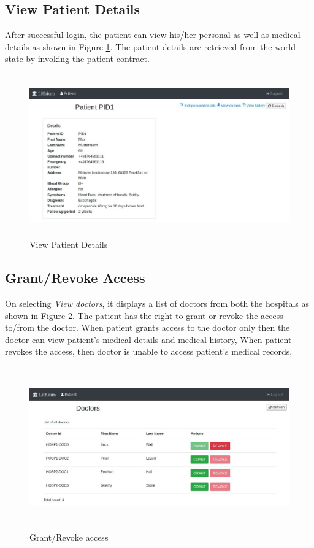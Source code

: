 \subsection{View Patient Details}
After successful login, the patient can view his/her personal as well as medical details as shown in Figure \ref{fig:chapter04:patient3}. The patient details are retrieved from the world state by invoking the patient contract.

\begin{figure}[htbp]
 \centering
 \includegraphics[width=1.1\textwidth, height=7cm]{gfx/figures/patient3.jpg}
 \caption{View Patient Details}
 \label{fig:chapter04:patient3}
\end{figure}

\subsection{Grant/Revoke Access}
On selecting \textit{View doctors}, it displays a list of doctors from both the hospitals  as shown in Figure \ref{fig:chapter04:patient4}. The patient has the right to grant or revoke the access to/from the doctor. When patient grants access to the doctor only then the doctor can view patient's medical details and medical history, When patient revokes the access, then doctor is unable to access patient's medical records, 

\begin{figure}[htbp]
 \centering
 \includegraphics[width=1.1\textwidth, height=7cm]{gfx/figures/patient4.jpg}
 \caption{Grant/Revoke access}
 \label{fig:chapter04:patient4}
\end{figure}

